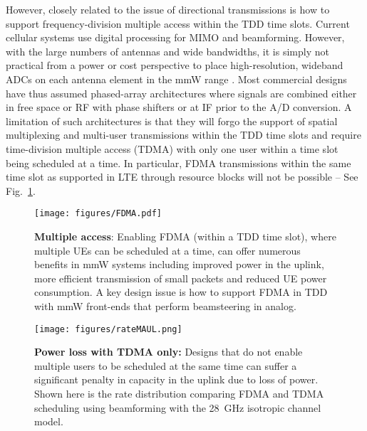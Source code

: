\documentclass[journal]{IEEEtran}
\begin{document}
However, closely related to the issue of directional transmissions is how to support
frequency-division multiple access within the TDD time slots.
Current cellular systems use digital processing for MIMO and beamforming.
However, with the large numbers of antennas and wide bandwidths,
it is simply not practical from a power or cost perspective to place
high-resolution, wideband ADCs on each antenna element in the mmW range
\cite{Ted:60Gstate11,KhanPi:11-CommMag,KhanPi:11}.
Most commercial designs have thus assumed phased-array architectures where signals
are combined either in free space or
RF with phase shifters \cite{ParkZim:02,KohReb:07,KohReb:09}
or at  IF \cite{Crane-Patent:88,RamBaRe:98,GuanHaHa:04} prior to the A/D conversion.
A limitation of such architectures is that they
will forgo the support of spatial multiplexing and multi-user
transmissions within the TDD time slots and require time-division
multiple access (TDMA) with only one user within a time slot being scheduled at a time.
In particular, FDMA transmissions within the same time slot
as supported in LTE through resource blocks
will not be possible -- See Fig.~\ref{fig:FDMA}.

\begin{figure}
    \centering
    \texttt{[image: figures/FDMA.pdf]}
    \caption{\textbf{Multiple access}:  Enabling FDMA (within a TDD time slot),
    where multiple UEs can be scheduled
    at a time, can offer numerous benefits in mmW systems including improved
    power in the uplink, more efficient transmission of small packets and
    reduced UE power consumption.  A key design issue is how to support FDMA in TDD
    with mmW front-ends that perform beamsteering in analog.}
    \label{fig:FDMA}
\end{figure}


\begin{figure}
    \centering
    \texttt{[image: figures/rateMAUL.png]}
    \caption{\textbf{Power loss with TDMA only:}  Designs that
    do not enable multiple users to be scheduled at the same time can suffer a significant
    penalty in capacity in the uplink due to loss of power.  Shown here is the rate
    distribution comparing FDMA and TDMA scheduling using beamforming with the 28~GHz isotropic
    channel model. }
    \label{fig:rateGeoMA}
\end{figure}
\end{document}
